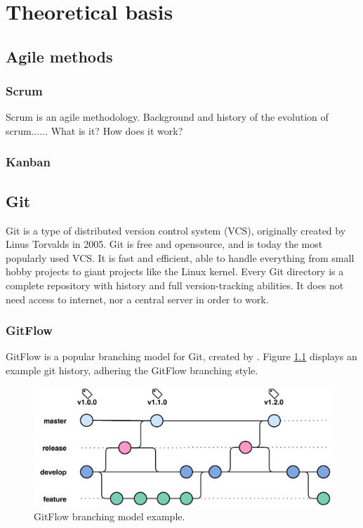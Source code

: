 \chapter{Theoretical basis}

\section{Agile methods}
\subsection{Scrum}
Scrum is an agile methodology. 
Background and history of the evolution of scrum......
What is it? How does it work?

\subsection{Kanban}

\section{Git}
Git is a type of distributed version control system (VCS), originally created by Linus Torvalds in 2005. Git is free and opensource, and is today the most popularly used VCS. It is fast and efficient, able to handle everything from small hobby projects to giant projects like the Linux kernel. Every Git directory is a complete repository with history and full version-tracking abilities. It does not need access to internet, nor a central server in order to work.

\subsection{GitFlow}
GitFlow is a popular branching model for Git, created by \cite{gitflow}. Figure \ref{fig:gitflow} displays an example git history, adhering the GitFlow branching style.
\begin{figure}[h]
    \centering
    \includegraphics[page=1,width=\textwidth]{sections/methodology/figures/gitflow.pdf}
    \caption{GitFlow branching model example.}
    \label{fig:gitflow}
\end{figure}

